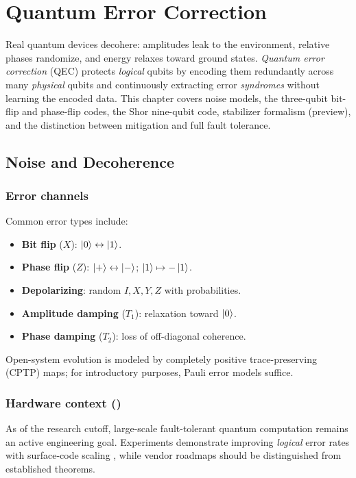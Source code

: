 \chapter{Quantum Error Correction}
\label{ch:qec}

Real quantum devices decohere: amplitudes leak to the environment, relative phases randomize, and energy relaxes toward ground states. \emph{Quantum error correction} (QEC) protects \emph{logical} qubits by encoding them redundantly across many \emph{physical} qubits and continuously extracting error \emph{syndromes} without learning the encoded data. This chapter covers noise models, the three-qubit bit-flip and phase-flip codes, the Shor nine-qubit code, stabilizer formalism (preview), and the distinction between mitigation and full fault tolerance.

\section{Noise and Decoherence}
\label{sec:noise}

\subsection{Error channels}

Common error types include:
\begin{itemize}[noitemsep]
\item \textbf{Bit flip} ($X$): $\ket{0}\leftrightarrow\ket{1}$.
\item \textbf{Phase flip} ($Z$): $\ket{+}\leftrightarrow\ket{-}$; $\ket{1}\mapsto-\ket{1}$.
\item \textbf{Depolarizing}: random $I,X,Y,Z$ with probabilities.
\item \textbf{Amplitude damping} ($T_1$): relaxation toward $\ket{0}$.
\item \textbf{Phase damping} ($T_2$): loss of off-diagonal coherence.
\end{itemize}
Open-system evolution is modeled by completely positive trace-preserving (CPTP) maps; for introductory purposes, Pauli error models suffice.

\subsection{Hardware context (\cutoff{})}

As of the \cutoff{} research cutoff, large-scale fault-tolerant quantum computation remains an active engineering goal. Experiments demonstrate improving \emph{logical} error rates with surface-code scaling \cite{acharya2024}, while vendor roadmaps should be distinguished from established theorems.

